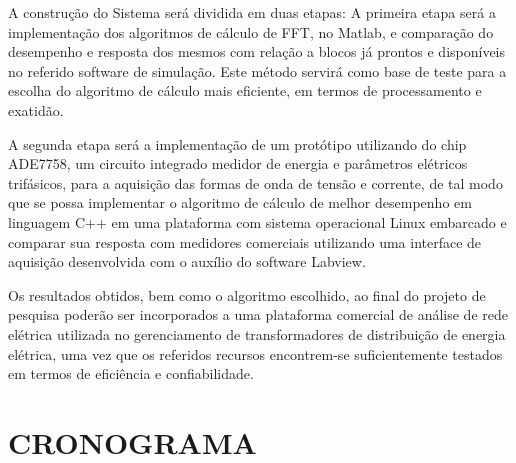\documentclass[
	12pt,				%
	openright,			%
	oneside,			%
	a4paper,			%
	chapter=TITLE,		%
	english,			%
	french,				%
	spanish,			%
	brazil,				%
	article,			%
	]{uea-abntex2}
\begin{document}
A construção do Sistema será dividida em duas etapas: A primeira etapa será a implementação dos algoritmos de cálculo de FFT, no Matlab, e comparação do desempenho e resposta dos mesmos com relação a blocos já prontos e disponíveis no referido software de simulação. Este método servirá como base de teste para a escolha do algoritmo de cálculo mais eficiente, em termos de processamento e exatidão.

A segunda etapa será a implementação de um protótipo utilizando do chip ADE7758, um circuito integrado medidor de energia e parâmetros elétricos trifásicos, para a aquisição das formas de onda de tensão e corrente, de tal modo que se possa implementar o algoritmo de cálculo de melhor desempenho em linguagem C++ em uma plataforma com sistema operacional Linux embarcado e comparar sua resposta com medidores comerciais utilizando uma interface de aquisição desenvolvida com o auxílio do software Labview.

Os resultados obtidos, bem como o algoritmo escolhido, ao final do projeto de pesquisa poderão ser incorporados a uma plataforma comercial de análise de rede elétrica utilizada no gerenciamento de transformadores de distribuição de energia elétrica, uma vez que os referidos recursos encontrem-se suficientemente testados em termos de eficiência e confiabilidade.

\newpage

\section{CRONOGRAMA}
\end{document}
